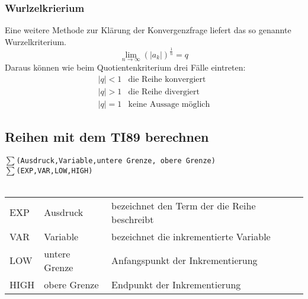 \subsubsection*{Wurlzelkrierium}
Eine weitere Methode zur Klärung der Konvergenzfrage liefert das so genannte Wurzelkriterium.
\[ \lim\limits_{n \rightarrow \infty} \left( |a_k| \right)^{\frac{1}{n}} = q\]
Daraus können wie beim Quotientenkriterium drei Fälle eintreten:
\[ \boxed{\begin{array}{ll}
|q| < 1 & \text{die Reihe konvergiert} \\
|q| > 1 & \text{die Reihe divergiert} \\
|q| = 1 & \text{keine Aussage möglich} 
\end{array}} \]


\ifti
\subsection*{Reihen mit dem TI89 berechnen}
$\sum$\verb{(Ausdruck,Variable,untere Grenze, obere Grenze){ \\
$\sum$\verb{(EXP,VAR,LOW,HIGH){ \\\\
\begin{tabular}{lll}
EXP  & Ausdruck      & bezeichnet den Term der die Reihe beschreibt \\
VAR  & Variable      & bezeichnet die inkrementierte Variable \\
LOW  & untere Grenze & Anfangspunkt der Inkrementierung \\
HIGH & obere Grenze  & Endpunkt der Inkrementierung \\
\end{tabular}
\fi
